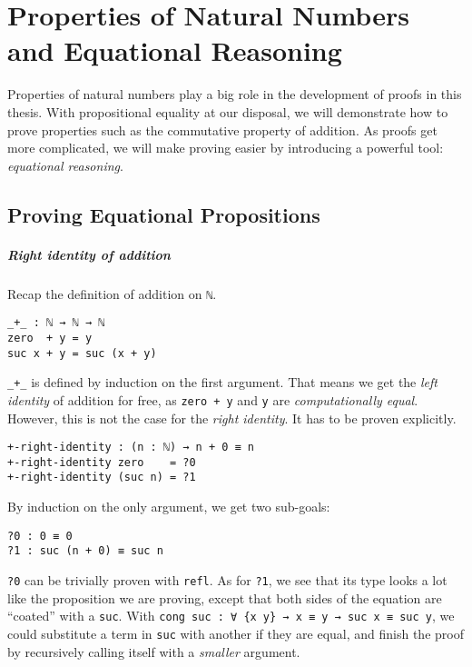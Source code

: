 \documentclass[../thesis.tex]{subfiles}
\begin{document}
\chapter{Properties of Natural Numbers and Equational Reasoning}\label{props}

Properties of natural numbers play a big role in the development of proofs in
this thesis. With propositional equality at our disposal, we will demonstrate how
to prove properties such as the commutative property of addition.
As proofs get more complicated, we will make proving easier by introducing a
powerful tool: \textit{equational reasoning}.

\section{Proving Equational Propositions}

\paragraph{Right identity of addition}

Recap the definition of addition on {\lstinline|ℕ|}.

\begin{lstlisting}
_+_ : ℕ → ℕ → ℕ
zero  + y = y
suc x + y = suc (x + y)
\end{lstlisting}

{\lstinline|_+_|} is defined by induction on the first argument. That means we
get the \textit{left identity} of addition for free, as {\lstinline|zero + y|}
and {\lstinline|y|} are \textit{computationally equal}. However, this is not the
case for the \textit{right identity}. It has to be proven explicitly.

\begin{lstlisting}
+-right-identity : (n : ℕ) → n + 0 ≡ n
+-right-identity zero    = ?0
+-right-identity (suc n) = ?1
\end{lstlisting}

By induction on the only argument, we get two sub-goals:

\begin{lstlisting}
?0 : 0 ≡ 0
?1 : suc (n + 0) ≡ suc n
\end{lstlisting}

{\lstinline|?0|} can be trivially proven with {\lstinline|refl|}.
As for {\lstinline|?1|}, we see that its type looks a lot like the proposition
we are proving, except that both sides of the equation are ``coated'' with a {\lstinline|suc|}.
With {\lstinline|cong suc : ∀ {x y} → x ≡ y → suc x ≡ suc y|}, we could substitute
a term in {\lstinline|suc|} with another if they are equal, and finish
the proof by recursively calling itself with a \textit{smaller} argument.
\end{document}

